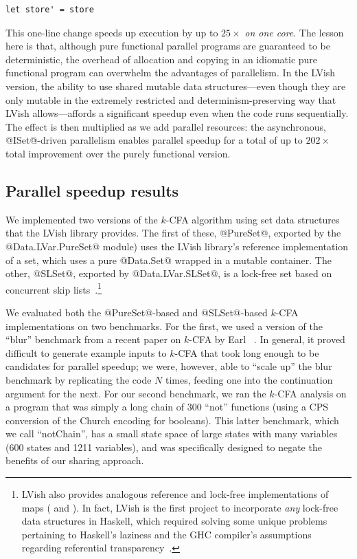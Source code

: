 \singlespacing
\begin{lstlisting}
let store' = store 
\end{lstlisting}
\doublespacing

This one-line change speeds up execution by up to $25\times$ \emph{on
  one core}.  The lesson here is that, although pure functional
parallel programs are guaranteed to be deterministic, the overhead of
allocation and copying in an idiomatic pure functional program can
overwhelm the advantages of parallelism.  In the LVish version, the
ability to use shared mutable data structures---even though they are
only mutable in the extremely restricted and determinism-preserving
way that LVish allows---affords a significant speedup even when the
code runs sequentially.  The effect is then multiplied as we add
parallel resources: the asynchronous, @ISet@-driven parallelism
enables parallel speedup for a total of up to $202\times$ total
improvement over the purely functional version.

\subsection{Parallel speedup results}\label{subsection:lvish-parallel-speedup-results}

We implemented two versions of the $k$-CFA algorithm using set data
structures that the LVish library provides.  The first of these,
@PureSet@, exported by the @Data.LVar.PureSet@ module) uses the LVish
library's reference implementation of a set, which uses a pure
@Data.Set@ wrapped in a mutable container.  The other, @SLSet@,
exported by @Data.LVar.SLSet@, is a lock-free set based on concurrent
skip lists~\cite{art}.\footnote{LVish also provides analogous
  reference and lock-free implementations of maps ( and
  ).  In fact, LVish is the first project to incorporate
  \emph{any} lock-free data structures in Haskell, which required
  solving some unique problems pertaining to Haskell's laziness and
  the GHC compiler's assumptions regarding referential
  transparency~\cite{RyanAtomicPrimopsTalk}.}

We evaluated both the @PureSet@-based and @SLSet@-based $k$-CFA
implementations on two benchmarks. For the first, we used a version of
the ``blur'' benchmark from a recent paper on $k$-CFA by Earl
\etal~.  In general, it proved difficult to
generate example inputs to $k$-CFA that took long enough to be
candidates for parallel speedup; we were, however, able to ``scale
up'' the blur benchmark by replicating the code $N$ times, feeding one
into the continuation argument for the next.  For our second
benchmark, we ran the $k$-CFA analysis on a program that was simply a
long chain of $300$ ``not'' functions (using a CPS conversion of the
Church encoding for booleans).  This latter benchmark, which we call
``notChain'', has a small state space of large states with many
variables (600 states and 1211 variables), and was specifically
designed to negate the benefits of our sharing approach.

